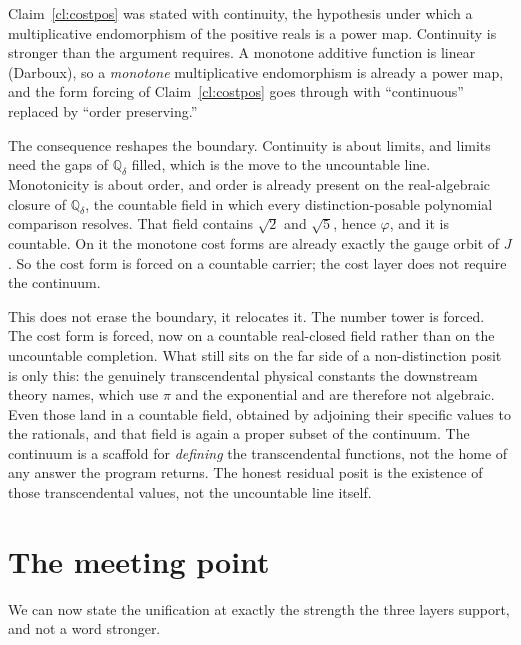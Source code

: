 \documentclass[11pt,a4paper]{article}
\theoremstyle{definition}
\theoremstyle{remark}
\newcommand{\Qdelta}{\mathbb{Q}_{\delta}}
\begin{document}
Claim~\ref{cl:costpos} was stated with continuity, the hypothesis under which a
multiplicative endomorphism of the positive reals is a power map. Continuity is
stronger than the argument requires. A monotone additive function is linear
(Darboux), so a \emph{monotone} multiplicative endomorphism is already a power map,
and the form forcing of Claim~\ref{cl:costpos} goes through with ``continuous''
replaced by ``order preserving.''

The consequence reshapes the boundary. Continuity is about limits, and limits need
the gaps of $\Qdelta$ filled, which is the move to the uncountable line.
Monotonicity is about order, and order is already present on the real-algebraic
closure of $\Qdelta$, the countable field in which every distinction-posable
polynomial comparison resolves. That field contains $\sqrt{2}$ and $\sqrt{5}$,
hence $\varphi$, and it is countable. On it the monotone cost forms are already
exactly the gauge orbit of $J$. So the cost form is forced on a countable carrier;
the cost layer does not require the continuum.

This does not erase the boundary, it relocates it. The number tower is forced. The
cost form is forced, now on a countable real-closed field rather than on the
uncountable completion. What still sits on the far side of a non-distinction posit
is only this: the genuinely transcendental physical constants the downstream theory
names, which use $\pi$ and the exponential and are therefore not algebraic. Even
those land in a countable field, obtained by adjoining their specific values to the
rationals, and that field is again a proper subset of the continuum. The continuum
is a scaffold for \emph{defining} the transcendental functions, not the home of any
answer the program returns. The honest residual posit is the existence of those
transcendental values, not the uncountable line itself.

\section{The meeting point}\label{sec:meeting}

We can now state the unification at exactly the strength the three layers support,
and not a word stronger.
\end{document}
